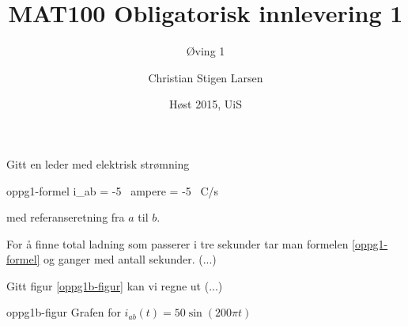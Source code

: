 \documentclass[a4paper,norsk,12pt]{article}
\title{MAT100 \strek Obligatorisk innlevering 1}
\subtitle{Øving 1}
\author{Christian Stigen Larsen}
\date{Høst 2015, UiS}
\begin{document}
  \maketitle

  Gitt en leder med elektrisk strømning

  \begin{formel}{oppg1-formel}
    i_{ab} = -5 \, \textrm{ampere} = -5 \, \textrm{C/s}
  \end{formel}

  med referanseretning fra $a$ til $b$.

  For å finne total ladning som passerer i tre sekunder tar man
  formelen \ref{oppg1-formel} og ganger med antall sekunder. (...)

  Gitt figur \ref{oppg1b-figur} kan vi regne ut (...)

         {oppg1b-figur}
         {Grafen for $i_{ab}(t) = 50 \sin(200 \pi t)$}
\end{document}
